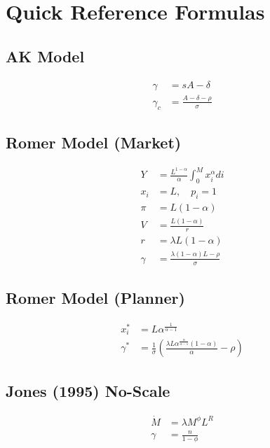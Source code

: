 \documentclass[a4paper,11pt]{article}
\begin{document}
\clearpage

\section{Quick Reference Formulas}

\subsection*{AK Model}
\begin{align*}
\gamma &= sA - \delta \tag{AK} \\
\gamma_c &= \frac{A - \delta - \rho}{\sigma} \tag{AK-Ramsey}
\end{align*}

\subsection*{Romer Model (Market)}
\begin{align*}
Y &= \frac{L^{1-\alpha}}{\alpha} \int_0^M x_i^\alpha di \\
x_i &= L, \quad p_i = 1 \\
\pi &= L(1-\alpha) \\
V &= \frac{L(1-\alpha)}{r} \\
r &= \lambda L(1-\alpha) \\
\gamma &= \frac{\lambda(1-\alpha)L - \rho}{\sigma}
\end{align*}

\subsection*{Romer Model (Planner)}
\begin{align*}
x_i^* &= L\alpha^{\frac{1}{\alpha-1}} \\
\gamma^* &= \frac{1}{\sigma}\left(\frac{\lambda L \alpha^{\frac{\alpha}{\alpha-1}}(1-\alpha)}{\alpha} - \rho\right)
\end{align*}

\subsection*{Jones (1995) No-Scale}
\begin{align*}
\dot{M} &= \lambda M^\phi L^R \\
\gamma &= \frac{n}{1-\phi}
\end{align*}
\end{document}

